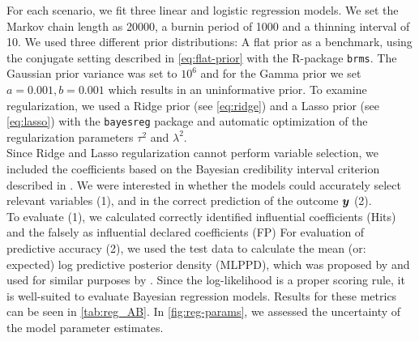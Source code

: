 For each scenario, we fit three linear and logistic regression models.
We set the Markov chain length as 20000, a burnin period of 1000 and a thinning interval of 10. We used three different prior distributions: A flat prior as a benchmark, using the conjugate setting described in \autoref{eq:flat-prior} with the R-package \texttt{brms}.
The Gaussian prior variance was set to $10^6$ and for the Gamma prior we set $a = 0.001, b=0.001$ which results in an uninformative prior. To examine regularization, we used a Ridge prior (see \autoref{eq:ridge}) and a Lasso prior (see \autoref{eq:lasso})  with the \texttt{bayesreg} package and automatic optimization of the regularization parameters $\tau^2$ and $\lambda^2$.\\

Since Ridge and Lasso regularization cannot perform variable selection, we included the coefficients based on the Bayesian credibility interval criterion described in \citet{van_erp_shrinkage_2019}.
We were interested in whether the models could accurately select relevant variables (1), and in the correct prediction of the outcome $\bm{y}$ (2).\\

To evaluate (1), we calculated correctly identified influential coefficients (Hits) and the falsely as influential declared coefficients (FP)
For evaluation of predictive accuracy (2), we used the test data to calculate the mean (or: expected) log predictive posterior density (MLPPD), which was proposed by \citet{gelman_understanding_2013} and used for similar purposes by \citet{van_erp_shrinkage_2019}. Since the log-likelihood is a proper scoring rule, it is well-suited to evaluate Bayesian regression models.
Results for these metrics can be seen in \autoref{tab:reg_AB}.
In \autoref{fig:reg-params}, we assessed the uncertainty of the model parameter estimates.


